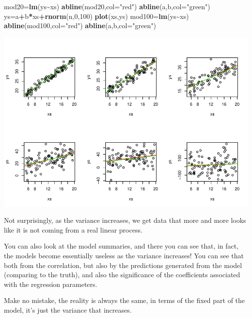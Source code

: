 \documentclass[
]{book}
\newenvironment{Shaded}{\begin{snugshade}}{\end{snugshade}}
\newcommand{\AttributeTok}[1]{\textcolor[rgb]{0.13,0.29,0.53}{#1}}
\newcommand{\DecValTok}[1]{\textcolor[rgb]{0.00,0.00,0.81}{#1}}
\newcommand{\FunctionTok}[1]{\textcolor[rgb]{0.13,0.29,0.53}{\textbf{#1}}}
\newcommand{\NormalTok}[1]{#1}
\newcommand{\OtherTok}[1]{\textcolor[rgb]{0.56,0.35,0.01}{#1}}
\newcommand{\SpecialCharTok}[1]{\textcolor[rgb]{0.81,0.36,0.00}{\textbf{#1}}}
\newcommand{\StringTok}[1]{\textcolor[rgb]{0.31,0.60,0.02}{#1}}
\begin{document}
\begin{Shaded}
\begin{Highlighting}[]
\NormalTok{mod20}\OtherTok{=}\FunctionTok{lm}\NormalTok{(ys}\SpecialCharTok{\textasciitilde{}}\NormalTok{xs)}
\FunctionTok{abline}\NormalTok{(mod20,}\AttributeTok{col=}\StringTok{"red"}\NormalTok{)}
\FunctionTok{abline}\NormalTok{(a,b,}\AttributeTok{col=}\StringTok{"green"}\NormalTok{)}
\NormalTok{ys}\OtherTok{=}\NormalTok{a}\SpecialCharTok{+}\NormalTok{b}\SpecialCharTok{*}\NormalTok{xs}\SpecialCharTok{+}\FunctionTok{rnorm}\NormalTok{(n,}\DecValTok{0}\NormalTok{,}\DecValTok{100}\NormalTok{)}
\FunctionTok{plot}\NormalTok{(xs,ys)}
\NormalTok{mod100}\OtherTok{=}\FunctionTok{lm}\NormalTok{(ys}\SpecialCharTok{\textasciitilde{}}\NormalTok{xs)}
\FunctionTok{abline}\NormalTok{(mod100,}\AttributeTok{col=}\StringTok{"red"}\NormalTok{)}
\FunctionTok{abline}\NormalTok{(a,b,}\AttributeTok{col=}\StringTok{"green"}\NormalTok{)}
\end{Highlighting}
\end{Shaded}

\includegraphics{ECOMODbook_files/figure-latex/a6.27-1.pdf}

Not surprisingly, as the variance increases, we get data that more and more looks like it is not coming from a real linear process.

You can also look at the model summaries, and there you can see that, in fact, the models become essentially useless as the variance increases! You can see that both from the correlation, but also by the predictions generated from the model (comparing to the truth), and also the significance of the coefficients associated with the regression parameters.

Make no mistake, the reality is always the same, in terms of the fixed part of the model, it's just the variance that increases.
\end{document}
